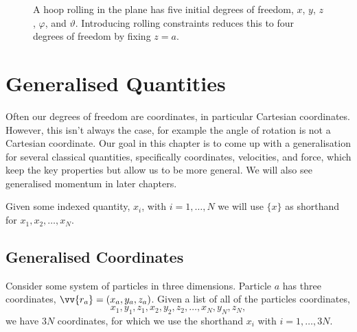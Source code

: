 \documentclass[fleqn]{NotesClass}
\begin{document}
    \begin{figure}
        \caption{A hoop rolling in the plane has five initial degrees of freedom, \(x\), \(y\), \(z\), \(\varphi\), and \(\vartheta\). Introducing rolling constraints reduces this to four degrees of freedom by fixing \(z = a\).}
    \end{figure}
    
    \chapter{Generalised Quantities}
    Often our degrees of freedom are coordinates, in particular Cartesian coordinates.
    However, this isn't always the case, for example the angle of rotation is not a Cartesian coordinate.
    Our goal in this chapter is to come up with a generalisation for several classical quantities, specifically coordinates, velocities, and force, which keep the key properties but allow us to be more general.
    We will also see generalised momentum in later chapters.
    
    \begin{ntn}{}{}
        Given some indexed quantity, \(x_i\), with \(i = 1, \dotsc, N\) we will use \(\{x\}\) as shorthand for \(x_1, x_2, \dotsc, x_N\).
    \end{ntn}

    \section{Generalised Coordinates}
    Consider some system of particles in three dimensions.
    Particle \(a\) has three coordinates, \(\vv{r_a} = (x_a, y_a, z_a)\).
    Given a list of all of the particles coordinates,
    \begin{equation}
        x_1, y_1, z_1, x_2, y_2, z_2, \dotsc, x_N, y_N, z_N,
    \end{equation}
    we have \(3N\) coordinates, for which we use the shorthand \(x_i\) with \(i = 1, \dotsc, 3N\).
    
\end{document}
